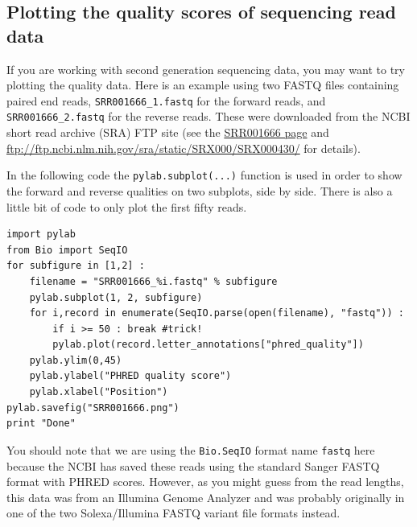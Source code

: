 \documentclass{report}
\begin{document}
\subsection{Plotting the quality scores of sequencing read data}

If you are working with second generation sequencing data, you may want to try plotting
the quality data. Here is an example using two FASTQ files containing paired end reads,
\texttt{SRR001666\_1.fastq} for the forward reads, and  \texttt{SRR001666\_2.fastq} for
the reverse reads. These were downloaded from the NCBI short read archive (SRA) FTP site
(see the \href{http://www.ncbi.nlm.nih.gov/Traces/sra/sra.cgi?cmd=viewer&m=data&s=viewer&run=SRR001666}
{SRR001666 page} and \url{ftp://ftp.ncbi.nlm.nih.gov/sra/static/SRX000/SRX000430/}
for details).

In the following code the \verb|pylab.subplot(...)| function is used in order to show
the forward and reverse qualities on two subplots, side by side. There is also a little
bit of code to only plot the first fifty reads.

\begin{verbatim}
import pylab
from Bio import SeqIO
for subfigure in [1,2] :
    filename = "SRR001666_%i.fastq" % subfigure
    pylab.subplot(1, 2, subfigure)
    for i,record in enumerate(SeqIO.parse(open(filename), "fastq")) :
        if i >= 50 : break #trick!
        pylab.plot(record.letter_annotations["phred_quality"])
    pylab.ylim(0,45)
    pylab.ylabel("PHRED quality score")
    pylab.xlabel("Position")
pylab.savefig("SRR001666.png")
print "Done"
\end{verbatim}

You should note that we are using the \verb|Bio.SeqIO| format name \texttt{fastq}
here because the NCBI has saved these reads using the standard Sanger FASTQ format
with PHRED scores. However, as you might guess from the read lengths, this data was
from an Illumina Genome Analyzer and was probably originally in one of the two
Solexa/Illumina FASTQ variant file formats instead.
\end{document}
